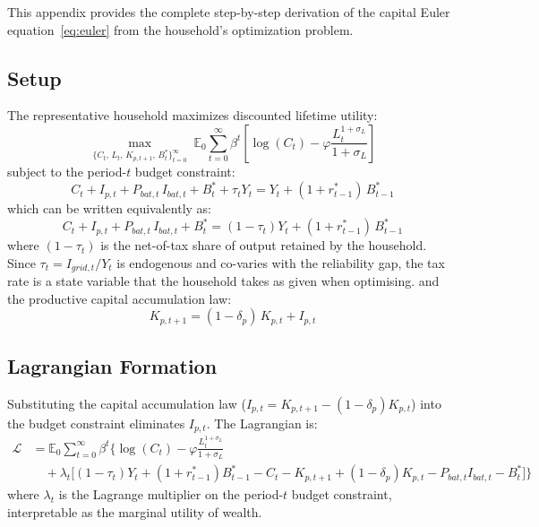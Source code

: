 \documentclass[12pt, a4paper]{article}
\begin{document}
	This appendix provides the complete step-by-step derivation of the capital Euler equation~\eqref{eq:euler} from the household's optimization problem.
	
	\subsection*{Setup}
	
	The representative household maximizes discounted lifetime utility:
	\begin{equation*}
		\max_{\{C_t,\, L_t,\, K_{p,t+1},\, B^*_t\}_{t=0}^{\infty}} \;
		\mathbb{E}_0 \sum_{t=0}^{\infty} \beta^t
		\left[\log(C_t) - \varphi \frac{L_t^{1+\sigma_L}}{1+\sigma_L}\right]
	\end{equation*}
	subject to the period-$t$ budget constraint:
	\begin{equation*}
		C_t + I_{p,t} + P_{bat,t}\,I_{bat,t} + B^*_t + \tau_t Y_t
		= Y_t + (1+r^*_{t-1})\,B^*_{t-1}
	\end{equation*}
	which can be written equivalently as:
	\begin{equation*}
		C_t + I_{p,t} + P_{bat,t}\,I_{bat,t} + B^*_t
		= (1-\tau_t) Y_t + (1+r^*_{t-1})\,B^*_{t-1}
	\end{equation*}
	where $(1-\tau_t)$ is the net-of-tax share of output retained by the household. Since $\tau_t = I_{grid,t}/Y_t$ is endogenous and co-varies with the reliability gap, the tax rate is a state variable that the household takes as given when optimising.
	and the productive capital accumulation law:
	\begin{equation*}
		K_{p,t+1} = (1-\delta_p)\,K_{p,t} + I_{p,t}
	\end{equation*}
	
	\subsection*{Lagrangian Formation}
	
	Substituting the capital accumulation law ($I_{p,t} = K_{p,t+1} - (1-\delta_p)K_{p,t}$) into the budget constraint eliminates $I_{p,t}$. The Lagrangian is:
	\begin{align*}
		\mathcal{L} &= \mathbb{E}_0 \sum_{t=0}^{\infty} \beta^t \Bigg\{
		\log(C_t) - \varphi \frac{L_t^{1+\sigma_L}}{1+\sigma_L} \\
		&\quad + \lambda_t \Big[(1-\tau_t)Y_t + (1+r^*_{t-1})B^*_{t-1} - C_t
		- K_{p,t+1} + (1-\delta_p)K_{p,t}
		- P_{bat,t}I_{bat,t} - B^*_t\Big]
		\Bigg\}
	\end{align*}
	where $\lambda_t$ is the Lagrange multiplier on the period-$t$ budget constraint, interpretable as the marginal utility of wealth.
	
\end{document}

